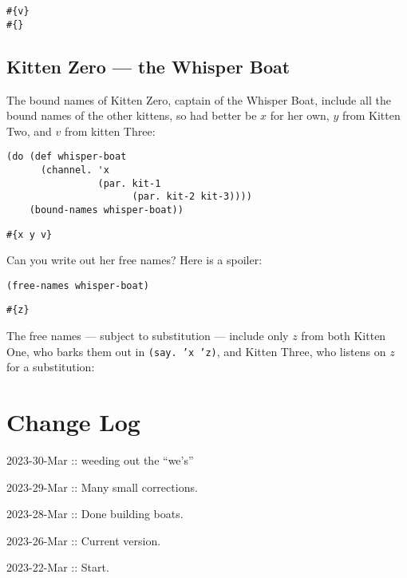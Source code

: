 \documentclass[10pt,oneside,x11names]{article}
\theoremstyle{definition}
\theoremstyle{warning}
\begin{document}
\begin{verbatim}
#{v}
#{}
\end{verbatim}

\subsection{Kitten Zero --- the Whisper Boat}
\label{sec:orgde1b8b9}

The bound names of Kitten Zero, captain of the Whisper Boat,
include all the bound names of the other kittens, so had better be
\(x\) for her own, \(y\) from Kitten Two, and \(v\) from kitten Three:

\vskip 0.26cm
\begin{verbatim}
(do (def whisper-boat
      (channel. 'x
                (par. kit-1
                      (par. kit-2 kit-3))))
    (bound-names whisper-boat))
\end{verbatim}

\begin{verbatim}
#{x y v}
\end{verbatim}


Can you write out her free names? Here is a spoiler:

\vskip 0.26cm
\begin{verbatim}
(free-names whisper-boat)
\end{verbatim}

\begin{verbatim}
#{z}
\end{verbatim}


The free names --- subject to substitution --- include only \(z\)
from both Kitten One, who barks them out in \texttt{(say. 'x 'z)}, and
Kitten Three, who listens on \(z\) for a substitution:

\section{Change Log}
\label{sec:org848a0d1}

2023-30-Mar :: weeding out the ``we's''

2023-29-Mar :: Many small corrections.

2023-28-Mar :: Done building boats.

2023-26-Mar :: Current version.

2023-22-Mar :: Start.
\end{document}
